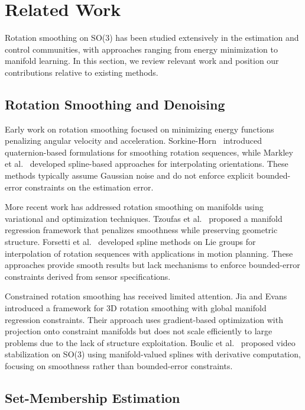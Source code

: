 \section{Related Work}

Rotation smoothing on SO(3) has been studied extensively in the estimation and control communities, with approaches ranging from energy minimization to manifold learning. In this section, we review relevant work and position our contributions relative to existing methods.

\subsection{Rotation Smoothing and Denoising}

Early work on rotation smoothing focused on minimizing energy functions penalizing angular velocity and acceleration. Sorkine-Horn~\cite{sorkine_horn} introduced quaternion-based formulations for smoothing rotation sequences, while Markley et al.~\cite{markley} developed spline-based approaches for interpolating orientations. These methods typically assume Gaussian noise and do not enforce explicit bounded-error constraints on the estimation error.

More recent work has addressed rotation smoothing on manifolds using variational and optimization techniques. Tzoufas et al.~\cite{tzoufas} proposed a manifold regression framework that penalizes smoothness while preserving geometric structure. Forsetti et al.~\cite{forsetti} developed spline methods on Lie groups for interpolation of rotation sequences with applications in motion planning. These approaches provide smooth results but lack mechanisms to enforce bounded-error constraints derived from sensor specifications.

Constrained rotation smoothing has received limited attention. Jia and Evans~\cite{jia_evans} introduced a framework for 3D rotation smoothing with global manifold regression constraints. Their approach uses gradient-based optimization with projection onto constraint manifolds but does not scale efficiently to large problems due to the lack of structure exploitation. Boulic et al.~\cite{boulic} proposed video stabilization on SO(3) using manifold-valued splines with derivative computation, focusing on smoothness rather than bounded-error constraints.

\subsection{Set-Membership Estimation}

